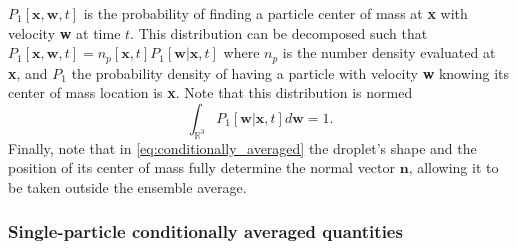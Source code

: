 $P_1[\textbf{x},\textbf{w},t]$ is the probability of finding a particle center of mass at \textbf{x} with velocity \textbf{w} at time $t$.
This distribution can be decomposed such that $P_1[\textbf{x},\textbf{w},t] = n_p[\textbf{x},t] P_1[\textbf{w}|\textbf{x},t]$ where $n_p$ is the number density evaluated at \textbf{x}, and $P_1$ the probability density of having a particle with velocity \textbf{w} knowing its center of mass location is \textbf{x}. 
Note that this distribution is normed 
\begin{equation*}
    \int_{\mathbb{R}^3} P_1[\textbf{w}|\textbf{x},t] d \textbf{w} = 1. 
\end{equation*}
Finally, note that in \ref{eq:conditionally_averaged} the droplet's shape and the position of its center of mass fully determine the normal vector $\textbf{n}$, allowing it to be taken outside the ensemble average. 


\subsubsection{Single-particle conditionally averaged quantities}

